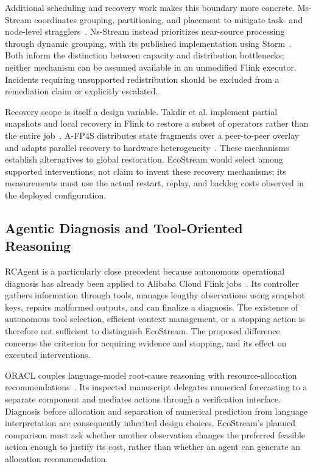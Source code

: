 Additional scheduling and recovery work makes this boundary more concrete. Ms-Stream coordinates grouping, partitioning, and placement to mitigate task- and node-level stragglers~\cite{wu2025msstream}. Ns-Stream instead prioritizes near-source processing through dynamic grouping, with its published implementation using Storm~\cite{wu2025nsstream}. Both inform the distinction between capacity and distribution bottlenecks; neither mechanism can be assumed available in an unmodified Flink executor. Incidents requiring unsupported redistribution should be excluded from a remediation claim or explicitly escalated.

Recovery scope is itself a design variable. Takdir et al. implement partial snapshots and local recovery in Flink to restore a subset of operators rather than the entire job~\cite{takdir2025localrecovery}. A-FP4S distributes state fragments over a peer-to-peer overlay and adapts parallel recovery to hardware heterogeneity~\cite{xu2023afp4s}. These mechanisms establish alternatives to global restoration. EcoStream would select among supported interventions, not claim to invent these recovery mechanisms; its measurements must use the actual restart, replay, and backlog costs observed in the deployed configuration.

\subsection{Agentic Diagnosis and Tool-Oriented Reasoning}
RCAgent is a particularly close precedent because autonomous operational diagnosis has already been applied to Alibaba Cloud Flink jobs~\cite{wang2024rcagent}. Its controller gathers information through tools, manages lengthy observations using snapshot keys, repairs malformed outputs, and can finalize a diagnosis. The existence of autonomous tool selection, efficient context management, or a stopping action is therefore not sufficient to distinguish EcoStream. The proposed difference concerns the criterion for acquiring evidence and stopping, and its effect on executed interventions.

ORACL couples language-model root-cause reasoning with resource-allocation recommendations~\cite{bai2026oracl}. Its inspected manuscript delegates numerical forecasting to a separate component and mediates actions through a verification interface. Diagnosis before allocation and separation of numerical prediction from language interpretation are consequently inherited design choices. EcoStream's planned comparison must ask whether another observation changes the preferred feasible action enough to justify its cost, rather than whether an agent can generate an allocation recommendation.


